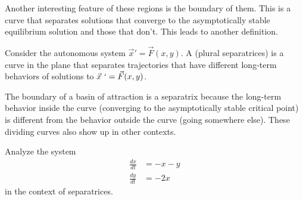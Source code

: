 \documentclass{ximera}
\begin{document}
Another interesting feature of these regions is the boundary of them. This is a curve that separates solutions that converge to the asymptotically stable equilibrium solution and those that don't. This leads to another definition.

\begin{definition}[Separatrix]
    Consider the autonomous system $\vec{x}' = \vec{F}(x,y)$. A \emph{} (plural separatrices) is a curve in the plane that separates trajectories that have different long-term behaviors of solutions to $\vec{x}\ ` = \vec{F}(x,y)$.
\end{definition}

The boundary of a basin of attraction is a separatrix because the long-term behavior inside the curve (converging to the asymptotically stable critical point) is different from the behavior outside the curve (going somewhere else). These dividing curves also show up in other contexts.

\begin{example} \label{ex:Separatrix}
    Analyze the system
    \begin{equation*}
        \begin{split}
            \frac{dx}{dt} &= -x -y\\
            \frac{dy}{dt} &= -2x
        \end{split}
    \end{equation*}
    in the context of separatrices.
\end{example}
\end{document}
